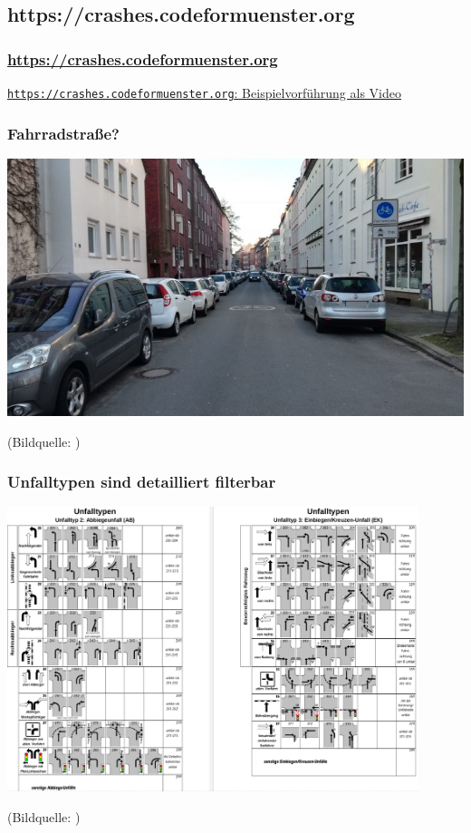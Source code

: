 \documentclass{beamer}
\begin{document}
\subsection{https://crashes.codeformuenster.org}

\begin{frame}
  \frametitle{\url{https://crashes.codeformuenster.org}}
  
  \href{beispielpraesentation-crashes.mkv}{\texttt{https://crashes.codeformuenster.org}: Beispielvorführung als Video}
  
\end{frame}

\begin{frame}
  \frametitle{Fahrradstraße?}
  
  \centering
  
  \includegraphics[width=\textwidth]{img/schillerstrasse.jpg}
  
  \vfill  
  {\scriptsize (Bildquelle: \cite{Chrobak2018})}
\end{frame}

\begin{frame}
  \frametitle{Unfalltypen sind detailliert filterbar}
  \centering
  
  \includegraphics[width=0.9\textwidth]{img/unfalltyp-details.png}
  
  \vfill
  {\scriptsize (Bildquelle: \cite[\href{https://recht.nrw.de/lmi/owa/br_show_anlage?p_id=15549}{Anlage 9}]{IMNRW2019})\par}
\end{frame}
\end{document}
